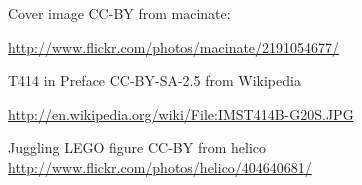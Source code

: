 Cover image CC-BY from macinate:

\url{http://www.flickr.com/photos/macinate/2191054677/}

T414 in Preface CC-BY-SA-2.5 from Wikipedia

\url{http://en.wikipedia.org/wiki/File:IMST414B-G20S.JPG}

Juggling LEGO figure CC-BY from helico
\url{http://www.flickr.com/photos/helico/404640681/}

\begin{comment}
	Juggling choices
	http://www.flickr.com/photos/teducation/2592566840/
	http://www.flickr.com/photos/sillylissy/2430488413/
	http://www.flickr.com/photos/helico/404640681/
\end{comment}